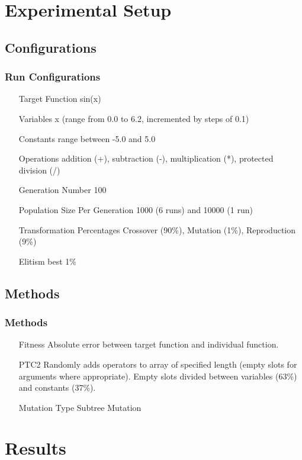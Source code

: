\documentclass{beamer}
\begin{document}
\section[Setup]{Experimental Setup}

\subsection{Configurations}

\begin{frame}
\frametitle{Run Configurations}
\begin{itemize}
\item[Target Function] sin(x)
\item[Variables] x (range from 0.0 to 6.2, incremented by steps of 0.1)
\item[Constants] range between -5.0 and 5.0
\item[Operations] addition (+), subtraction (-), multiplication (*), protected division (/)
\item[Generation Number] 100
\item[Population Size Per Generation] 1000 (6 runs) and 10000 (1 run)
\item[Transformation Percentages] Crossover (90\%), Mutation (1\%), Reproduction (9\%)
\item[Elitism] best 1\%
\end{itemize}
\end{frame}

\subsection{Methods}

\begin{frame}
\frametitle{Methods}
\begin{itemize}
\item[Fitness] Absolute error between target function and individual function.
\item[PTC2] Randomly adds operators to array of specified length (empty slots for arguments where appropriate). Empty slots divided between variables (63\%) and constants (37\%).
\item[Mutation Type] Subtree Mutation
\end{itemize}
\end{frame}

\section[Results]{Results}
\end{document}
